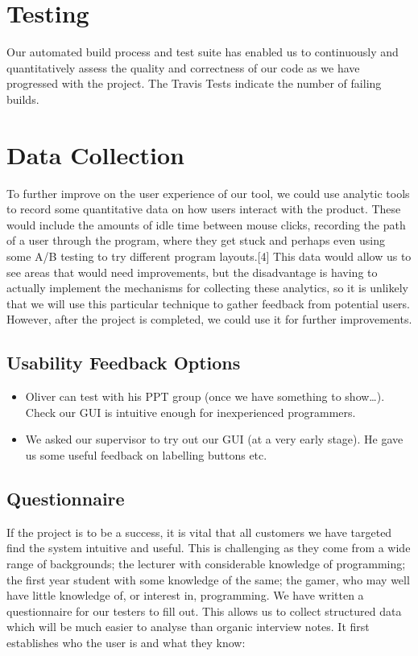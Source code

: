\documentclass[10pt, a4paper]{article}
\begin{document}
\section{Testing}
Our automated build process and test suite has enabled us to continuously and quantitatively assess the quality and correctness of our code as we have progressed with the project. The Travis Tests indicate the number of failing builds.

\section{Data Collection}
To further improve on the user experience of our tool, we could use analytic tools to record some quantitative data on how users interact with the product. These would include the amounts of idle time between mouse clicks, recording the path of a user through the program, where they get stuck and perhaps even using some A/B testing to try different program layouts.[4] This data would allow us to see areas that would need improvements, but the disadvantage is having to actually implement the mechanisms for collecting these analytics, so it is unlikely that we will use this particular technique to gather feedback from potential users. However, after the project is completed, we could use it for further improvements. 

\subsection{Usability Feedback Options}
\begin{itemize}

  \item Oliver can test with his PPT group (once we have something to show…). Check our GUI is intuitive enough for inexperienced programmers.
  \item We asked our supervisor to try out our GUI (at a very early stage). He gave us some useful feedback on labelling buttons etc.

\end{itemize}

\subsection{Questionnaire}

If the project is to be a success, it is vital that all customers we have targeted find the system intuitive and useful. This is challenging as they come from a wide range of backgrounds; the lecturer with considerable knowledge of programming; the first year student with some knowledge of the same; the gamer, who may well have little knowledge of, or interest in, programming. We have written a questionnaire for our testers to fill out. This allows us to collect structured data which will be much easier to analyse than organic interview notes. It first establishes who the user is and what they know:
\end{document}
